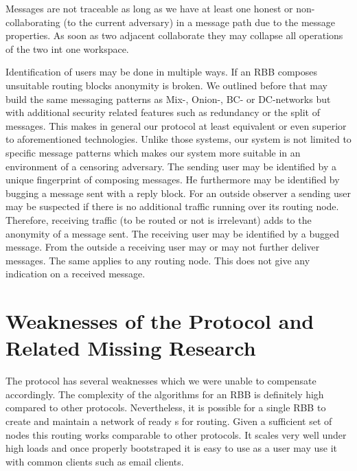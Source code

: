 Messages are not traceable as long as we have at least one honest or  non-collaborating (to the current adversary) \VortexNode{} in a message path due to the message properties. As soon as two adjacent \VortexNodes collaborate they may collapse all operations of the two int one workspace.

Identification of \MessageVortex{} users may be done in multiple ways. If an RBB composes unsuitable routing blocks anonymity is broken. We outlined before that \MessageVortex{} may build the same messaging patterns as Mix-, Onion-, BC- or DC-networks but with additional security related features such as redundancy or the split of messages. This makes in general our protocol at least equivalent or even superior to aforementioned technologies. Unlike those systems, our system is not limited to specific message patterns which makes our system more suitable in an environment of a censoring adversary. The sending user may be identified by a unique fingerprint of composing messages. He furthermore may be identified by bugging a message sent with a reply block. For an outside observer a sending user may be suspected if there is no additional traffic running over its routing node. Therefore, receiving traffic (to be routed or not is irrelevant) adds to the anonymity of a message sent. The receiving user may be identified by a bugged message. From the outside a receiving user may or may not further deliver messages. The same applies to any routing node. This does not give any indication on a received message.

\chapter{Weaknesses of the Protocol and Related Missing Research}
The protocol has several weaknesses which we were unable to compensate accordingly. The complexity of the algorithms for an RBB is definitely high compared to other protocols. Nevertheless, it is possible for a single RBB to create and maintain a network of ready s for routing. Given a sufficient set of nodes this routing works comparable to other protocols. It scales very well under high loads and once properly bootstraped it is easy to use as  a user may use it with common clients such as email clients.

